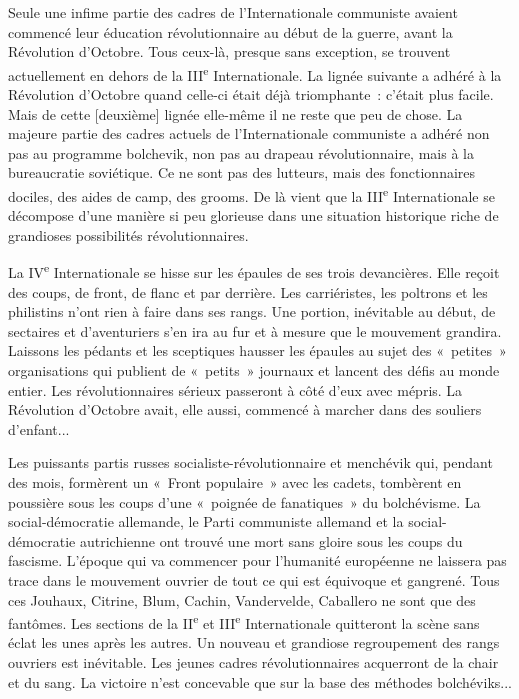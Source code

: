 \documentclass[french,twoside]{book} %
\newcommand\corr[1]{#1}
\newcommand\chapterclose{} %
\begin{document}
Seule une infime partie des cadres de l’Internationale communiste avaient commencé leur éducation révolutionnaire au début de la guerre, avant la Révolution d’Octobre. Tous ceux-là, presque sans exception, se trouvent actuellement en dehors de la III\textsuperscript{e} Internationale. La lignée suivante a adhéré à la Révolution d’Octobre quand celle-ci était déjà triomphante : c’était plus facile. Mais de cette [{\corr deuxième}] lignée elle-même il ne reste que peu de chose. La majeure partie des cadres actuels de l’Internationale communiste a adhéré non pas au programme bolchevik, non pas au drapeau révolutionnaire, mais à la bureaucratie soviétique. Ce ne sont pas des lutteurs, mais des fonctionnaires dociles, des aides de camp, des grooms. De là vient que la III\textsuperscript{e} Internationale se décompose d’une manière si peu glorieuse dans une situation historique riche de grandioses possibilités révolutionnaires.\par
La IV\textsuperscript{e} Internationale se hisse sur les épaules de ses trois devancières. Elle reçoit des coups, de front, de flanc et par derrière. Les carriéristes, les poltrons et les philistins n’ont rien à faire dans ses rangs. Une portion, inévitable au début, de sectaires et d’aventuriers s’en ira au fur et à mesure que le mouvement grandira. Laissons les pédants et les sceptiques hausser les épaules au sujet des « petites » organisations qui publient de « petits » journaux et lancent des défis au monde entier. Les révolutionnaires sérieux passeront à côté d’eux avec mépris.  La Révolution d’Octobre avait, elle aussi, commencé à marcher dans des souliers d’enfant...\par
Les puissants partis russes socialiste-révolutionnaire et menchévik qui, pendant des mois, formèrent un « Front populaire » avec les cadets, tombèrent en poussière sous les coups d’une « poignée de fanatiques » du bolchévisme. La social-démocratie allemande, le Parti communiste allemand et la social-démocratie autrichienne ont trouvé une mort sans gloire sous les coups du fascisme. L’époque qui va commencer pour l’humanité européenne ne laissera pas trace dans le mouvement ouvrier de tout ce qui est équivoque et gangrené. Tous ces Jouhaux, Citrine, Blum, Cachin, Vandervelde, Caballero ne sont que des fantômes. Les sections de la II\textsuperscript{e} et III\textsuperscript{e} Internationale quitteront la scène sans éclat les unes après les autres. Un nouveau et grandiose regroupement des rangs ouvriers est inévitable. Les jeunes cadres révolutionnaires acquerront de la chair et du sang. La victoire n’est concevable que sur la base des méthodes bolchéviks...
\chapterclose
\end{document}
